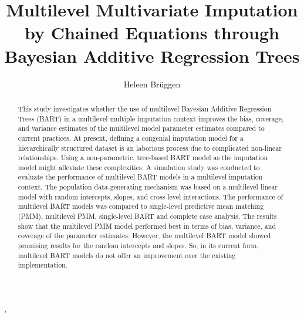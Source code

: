\documentclass[3p,12pt,a4paper]{elsarticle}
\begin{document}
\begin{frontmatter}
  \title{Multilevel Multivariate Imputation by Chained Equations through Bayesian Additive Regression Trees}
  \author{Heleen Brüggen}
  ,

  \begin{abstract}
    This study investigates whether the use of multilevel Bayesian Additive Regression Trees (BART) in a multilevel multiple imputation context improves the bias, coverage, and variance estimates of the multilevel model parameter estimates compared to current practices. At present, defining a congenial imputation model for a hierarchically structured dataset is an laborious process due to complicated non-linear relationships. Using a non-parametric, tree-based BART model as the imputation model might alleviate these complexities. A simulation study was conducted to evaluate the performance of multilevel BART models in a multilevel imputation context. The population data-generating mechanism was based on a multilevel linear model with random intercepts, slopes, and cross-level interactions. The performance of multilevel BART models was compared to single-level predictive mean matching (PMM), multilevel PMM, single-level BART and complete case analysis. The results show that the multilevel PMM model performed best in terms of bias, variance, and coverage of the parameter estimates. However, the multilevel BART model showed promising results for the random intercepts and slopes. So, in its current form, multilevel BART models do not offer an improvement over the existing implementation.
  \end{abstract}
\end{frontmatter}

\newpage
\tableofcontents
\newpage
\end{document}
